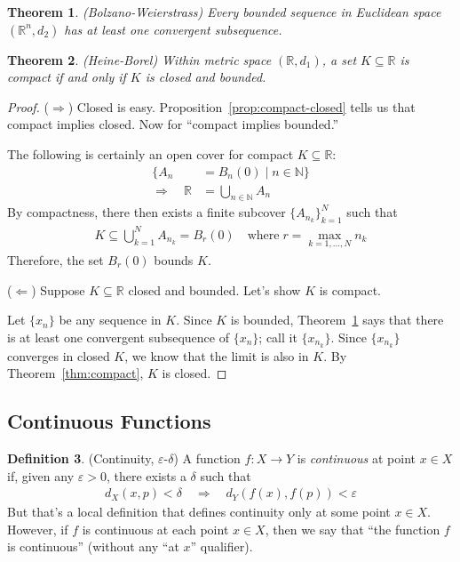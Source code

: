 \documentclass[12pt]{article}
\numberwithin{equation}{section} %
\theoremstyle{plain}
\newtheorem{thm}{Theorem}[section]
\theoremstyle{definition}
\newtheorem{defn}[thm]{Definition}
\theoremstyle{remark}
\newcommand{\R}{\mathbb{R}}
\begin{document}
\begin{thm}{\emph{(Bolzano-Weierstrass)}}
\label{thm:bolzano-weierstrass}
Every bounded sequence in Euclidean space $(\R^n,d_2)$ has at
least one convergent subsequence.
\end{thm}

\begin{thm}{\emph{(Heine-Borel)}}
\label{thm:heine-borel}
Within metric space $(\R,d_1)$, a set $K\subseteq \R$ is
compact if and only if $K$ is closed and bounded.
\end{thm}
\begin{proof}
($\Rightarrow$)
Closed is easy. Proposition~\ref{prop:compact-closed} tells us that
compact implies closed. Now for ``compact implies bounded.''

The following is certainly an open cover for compact
$K\subseteq \R$:
\begin{align*}
  \{ A_n &= B_n(0) \; | \; n \in \mathbb{N}\}\\
  \Rightarrow\quad
   \R &= \bigcup_{n\in \mathbb{N}} A_n
\end{align*}
By compactness, there then exists a finite subcover
$\{A_{n_k}\}_{k=1}^N$ such that
\begin{align*}
  K \subseteq \bigcup_{k=1}^N A_{n_k}
  = B_r(0)
  \quad \text{where} \;r=\max_{k=1,\ldots,N} n_k
\end{align*}
Therefore, the set $B_r(0)$ bounds $K$.

($\Leftarrow$) Suppose $K\subseteq \R$ closed and bounded. Let's
show $K$ is compact.

Let $\{x_n\}$ be any sequence in $K$. Since $K$ is bounded,
Theorem~\ref{thm:bolzano-weierstrass} says that there is at least one
convergent subsequence of $\{x_n\}$; call it $\{x_{n_k}\}$.  Since
$\{x_{n_k}\}$ converges in closed $K$, we know that the limit is also in
$K$. By Theorem~\ref{thm:compact}, $K$ is closed.
\end{proof}


\subsection{Continuous Functions}

\begin{defn}{(Continuity, $\varepsilon$-$\delta$)}
\label{defn:cts}
A function $f:X\rightarrow Y$ is \emph{continuous} at point $x\in X$ if,
given any $\varepsilon>0$, there exists a $\delta$ such that
\begin{align*}
  d_X(x,p) < \delta \quad \Rightarrow\quad
  d_Y(f(x),f(p))<\varepsilon
\end{align*}
But that's a local definition that defines continuity only at some point
$x\in X$. However, if $f$ is continuous at each point $x\in X$, then we
say that ``the function $f$ is continuous'' (without any ``at $x$''
qualifier).
\end{defn}
\end{document}
